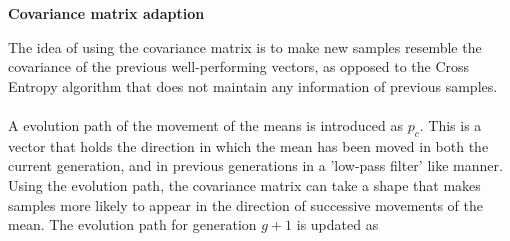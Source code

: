\textbf{Covariance matrix adaption}

The idea of using the covariance matrix is to make new samples
resemble the covariance of the previous well-performing vectors, as opposed 
to the Cross Entropy algorithm that does not maintain any information of
previous samples.\\
\\
A evolution path of the movement of the means is introduced as $p_{c}$. This 
is a vector that holds the direction in which the mean has been moved in 
both the current generation, and in previous generations in 
a 'low-pass filter' like manner. Using the 
evolution path, the covariance matrix can take a shape that 
makes samples more likely to appear in the direction of successive 
movements of the mean.
The evolution path for generation $g+1$ is updated as



